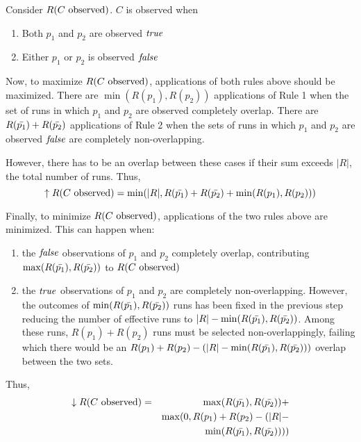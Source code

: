 Consider $R(\text{$C$ observed})$.  $C$ is observed when
\begin{enumerate}
\item Both $p_1$ and $p_2$ are observed $\mathit{true}$
\item Either $p_1$ or $p_2$ is observed $\mathit{false}$
\end{enumerate}

Now, to maximize $R(\text{$C$ observed})$, applications of both rules above should be
maximized.
There are $\min(R(p_1), R(p_2))$ applications of Rule 1 when the set 
of runs in which $p_1$ and $p_2$ are observed completely overlap.
There are $R(\text{$\bar{p_1}$}) + R(\text{$\bar{p_2}$})$ applications of Rule
2 when the sets of runs in which $p_1$ and $p_2$ are observed $\mathit{false}$ are
completely non-overlapping.

However, there has to be an overlap between these cases if their sum exceeds 
$|R|$, the total number of runs.  Thus,
\begin{equation}
  \uparrow R(\text{$C$ observed}) = \min(|R|, R(\text{$\bar{p_1}$}) + R(\text{$\bar{p_2}$})
                   + \min(R(p_1), R(p_2)))
\end{equation}

Finally, to minimize $R(\text{$C$ observed})$, applications of the two rules above are 
minimized.  This can happen when:
\begin{enumerate}
\item the $\mathit{false}$ observations of $p_1$ and $p_2$ completely overlap, contributing
$\max(R(\text{$\bar{p_1}$}), R(\text{$\bar{p_2}$}))$ to $R(\text{$C$ observed})$
\item the $\mathit{true}$ observations of $p_1$ and $p_2$ are completely non-overlapping.
However, the outcomes of $\min(R(\text{$\bar{p_1}$}), R(\text{$\bar{p_2}$}))$ runs has
been fixed in the previous step reducing the number of effective runs to
$|R| - \min(R(\text{$\bar{p_1}$}), R(\text{$\bar{p_2}$}))$.  Among these runs, $R(p_1) + R(p_2)$
runs must be selected non-overlappingly, failing which there would be an
$R(p_1) + R(p_2) - (|R| - \min(R(\text{$\bar{p_1}$}), R(\text{$\bar{p_2}$})))$ overlap
between the two sets.
\end{enumerate}

Thus,
\begin{eqnarray*}
  \downarrow R(\text{$C$ observed}) &=& \max(R(\text{$\bar{p_1}$}), R(\text{$\bar{p_2}$})) + \\
            & & \max(0, R(p_1) + R(p_2) - (|R| - \\
            & & \min(R(\text{$\bar{p_1}$}), R(\text{$\bar{p_2}$}))))
\end{eqnarray*}

